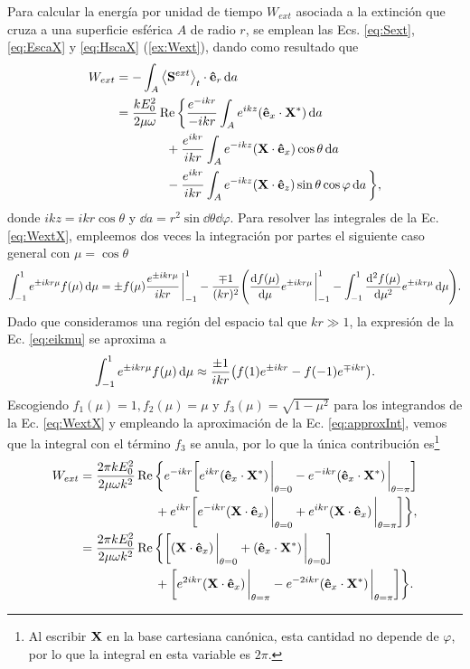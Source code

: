 Para calcular la energía por unidad de tiempo $W_{ext}$ asociada a la extinción que cruza a una superficie esférica $A$ de radio $r$, se emplean las Ecs. \eqref{eq:Sext}, \eqref{eq:EscaX} y \eqref{eq:HscaX}  (\ref{ex:Wext}), dando como resultado que
%	
\begin{align}
W_{ext} &= -\int_{A} \ev{\vb{S}^{ext}}_t\cdot\vu{e}_r\dd{a}\notag\\
 &= \frac{kE_0^2}{2\mu\omega}\Re\bigg\{
\frac{e^{-ikr}}{-ikr}
	\int_A e^{ikz} (\vu{e}_x\cdot\vb{X}^*)\dd{a}\notag\\
&\qquad\qquad+\frac{e^{ikr}}{ikr}
	\int_A e^{-ikz}(\vb{X}\cdot\vu{e}_x)\cos\theta\dd{a}\notag\\
&\qquad\qquad-\frac{e^{ikr}}{ikr}
	\int_A e^{-ikz}(\vb{X}\cdot\vu{e}_z)\sin\theta\cos\varphi\dd{a}
	\bigg\},
	\label{eq:WextX}
\end{align}
donde $ikz = ikr\cos\theta$ y $\dd{a} =r^2 \sin\dd{\theta}\dd{\varphi}$. Para resolver las integrales de la Ec. \eqref{eq:WextX}, empleemos dos veces la integración por partes el siguiente caso general con $\mu = \cos\theta$ 
%
\begin{align}
\int_{-1}^{1} e^{\pm ikr\mu}f(\mu)\dd{\mu} = \pm
f(\mu)\frac{e^{\pm ikr\mu}}{ikr}\eval_{-1}^1 -
\frac{\mp 1}{(kr)^2}\qty(
\dv{f(\mu)}{\mu}e^{\pm ikr\mu}\eval_{-1}^1 -\int_{-1}^1\dv[2]{f(\mu)}{\mu}e^{\pm ikr\mu}\dd{\mu}
).
\label{eq:eikmu}
\end{align}
%
Dado que consideramos una región del espacio tal que $kr\gg 1$, la expresión de la Ec. \eqref{eq:eikmu} se aproxima a
%
\begin{align}
\int_{-1}^{1} e^{\pm ikr\mu}f(\mu)\dd{\mu} \approx \frac{\pm 1}{ikr}\qty(f(1) e^{\pm ikr} - f(-1)e^{\mp ikr}).
\label{eq:approxInt}
\end{align}
%
Escogiendo $f_1(\mu) = 1, f_2(\mu) = \mu$ y $f_3(\mu) = \sqrt{1-\mu^2}$ para los integrandos de la Ec. \eqref{eq:WextX} y empleando la aproximación de la Ec. \eqref{eq:approxInt}, vemos que la integral con el término $f_3$ se anula, por lo que la única contribución es\footnote{Al escribir $\vb{X}$ en la base cartesiana canónica, esta cantidad no depende de $\varphi$, por lo que la integral en esta variable es $2\pi$.}
%
\begin{align}
W_{ext} &=  \frac{2\pi kE_0^2}{2\mu\omega k^2}\Re\bigg\{
e^{-ikr}\qty[
 e^{ikr} (\vu{e}_x\cdot\vb{X}^*) \eval_{\theta=0} - e^{-ikr} (\vu{e}_x\cdot\vb{X}^*) \eval_{\theta=\pi}
 ] \notag \\
&\qquad\qquad\qquad+e^{ikr}\qty[
 e^{-ikr}(\vb{X}\cdot\vu{e}_x)\eval_{\theta=0} + e^{ikr}(\vb{X}\cdot\vu{e}_x)\eval_{\theta = \pi}
	 ]
	\bigg\},\\
	&=  \frac{2\pi kE_0^2}{2\mu\omega k^2}\Re\bigg\{
\qty[
(\vb{X}\cdot\vu{e}_x)\eval_{\theta=0} +
 (\vu{e}_x\cdot\vb{X}^*) \eval_{\theta=0} 
 ]\notag \\
&\qquad\qquad\qquad+\qty[e^{2ikr}(\vb{X}\cdot\vu{e}_x)\eval_{\theta = \pi} - e^{-2ikr} (\vu{e}_x\cdot\vb{X}^*) \eval_{\theta=\pi}
	 ]
	\bigg\}.
\end{align}
